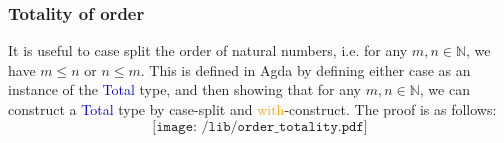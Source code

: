 \documentclass[12pt,a4paper]{report}
\theoremstyle{definition}
\newcommand{\secref}[1]{\S\ref{#1}}
\newcommand{\mb}[1]{\textcolor{mediumblue}{#1}}
\newcommand{\og}[1]{\textcolor{orange}{#1}}
\newcommand{\bN}{\mathbb{N}}
\begin{document}




    \subsubsection{Totality of order}
    It is useful to case split the order of natural numbers, i.e. for any $m, n \in \bN$, we have $m \leq n$ or $n \leq m$. This is defined in Agda by defining either case as an instance of the \mb{\textsf{Total}} type, and then showing that for any $m, n \in \bN$, we can construct a \mb{\textsf{Total}} type by case-split and \og{\textsf{with}}-construct. The proof is as follows:
    \[\texttt{[image: /lib/order\_totality.pdf]}\]
\end{document}
